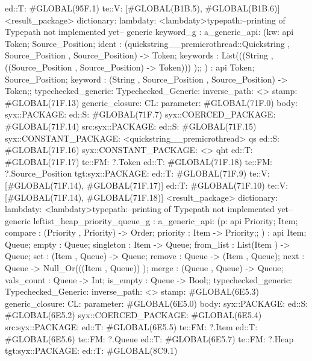                          ed::T: #GLOBAL(95F.1) te::V: [#GLOBAL(B1B.5), #GLOBAL(B1B.6)]
         <result_package>
dictionary:
lambdaty:
  <lambdaty>typepath:--printing of Typepath not implemented yet--
generic keyword_g
:
a_generic_api:
(kw:
api {
    Token;
    Source_Position;
    ident : (quickstring__premicrothread::Quickstring , Source_Position , Source_Position) -> Token;
    keywords : List(((String , ((Source_Position , Source_Position) -> Token))) );};
)
:
api {
    Token;
    Source_Position;
    keyword : (String , Source_Position , Source_Position) -> Token;};
typechecked_generic:
Typechecked_Generic:
inverse_path: <>
stamp: #GLOBAL(71F.13)
generic_closure:
CL:
parameter: #GLOBAL(71F.0)
body: syx::PACKAGE:
        ed::S: #GLOBAL(71F.7)
            syx::COERCED_PACKAGE:
                #GLOBAL(71F.14)
                 src:syx::PACKAGE:
                        ed::S: #GLOBAL(71F.15) syx::CONSTANT_PACKAGE: <quickstring__premicrothread> qs
                        ed::S: #GLOBAL(71F.16) syx::CONSTANT_PACKAGE: <> qht
                        ed::T: #GLOBAL(71F.17) te::FM: ?.Token
                        ed::T: #GLOBAL(71F.18) te::FM: ?.Source_Position
                tgt:syx::PACKAGE:
                    ed::T: #GLOBAL(71F.9)
                     te::V:
                     [#GLOBAL(71F.14), #GLOBAL(71F.17)]
                    ed::T: #GLOBAL(71F.10)
                     te::V:
                     [#GLOBAL(71F.14), #GLOBAL(71F.18)]
         <result_package>
dictionary:
lambdaty:
  <lambdaty>typepath:--printing of Typepath not implemented yet--
generic leftist_heap_priority_queue_g
:
a_generic_api:
(p:
api {
    Priority;
    Item;
    compare : (Priority , Priority) -> Order;
    priority : Item -> Priority;};
)
:
api {
    Item;
    Queue;
    empty : Queue;
    singleton : Item -> Queue;
    from_list : List(Item ) -> Queue;
    set : (Item , Queue) -> Queue;
    remove : Queue -> (Item , Queue);
    next : Queue -> Null_Or(((Item , Queue)) );
    merge : (Queue , Queue) -> Queue;
    vals_count : Queue -> Int;
    is_empty : Queue -> Bool;};
typechecked_generic:
Typechecked_Generic:
inverse_path: <>
stamp: #GLOBAL(6E5.3)
generic_closure:
CL:
parameter: #GLOBAL(6E5.0)
body: syx::PACKAGE:
        ed::S: #GLOBAL(6E5.2)
            syx::COERCED_PACKAGE:
                #GLOBAL(6E5.4)
                 src:syx::PACKAGE:
                        ed::T: #GLOBAL(6E5.5) te::FM: ?.Item
                            ed::T: #GLOBAL(6E5.6) te::FM: ?.Queue
                            ed::T: #GLOBAL(6E5.7) te::FM: ?.Heap
                tgt:syx::PACKAGE:
                    ed::T: #GLOBAL(8C9.1)
